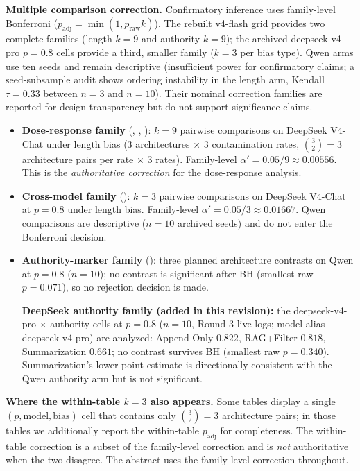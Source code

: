 \documentclass[11pt]{article}
\begin{document}
\textbf{Multiple comparison correction.} Confirmatory inference uses family-level Bonferroni ($p_{\text{adj}} = \min(1,p_{\text{raw}}k)$). The rebuilt v4-flash grid provides two complete families (length $k{=}9$ and authority $k{=}9$); the archived deepseek-v4-pro $p{=}0.8$ cells provide a third, smaller family ($k{=}3$ per bias type). Qwen arms use ten seeds and remain descriptive (insufficient power for confirmatory claims; a seed-subsample audit shows ordering instability in the length arm, Kendall $\tau=0.33$ between $n{=}3$ and $n{=}10$). Their nominal correction families are reported for design transparency but do not support significance claims.

\begin{itemize}[nosep]
    \item \textbf{Dose-response family} (, , ): $k = 9$ pairwise comparisons on DeepSeek V4-Chat under length bias ($3$ architectures $\times$ $3$ contamination rates, $\binom{3}{2}=3$ architecture pairs per rate $\times$ $3$ rates). Family-level $\alpha' = 0.05/9 \approx 0.00556$. This is the \emph{authoritative correction} for the dose-response analysis.
    \item \textbf{Cross-model family} (): $k = 3$ pairwise comparisons on DeepSeek V4-Chat at $p=0.8$ under length bias. Family-level $\alpha' = 0.05/3 \approx 0.01667$. Qwen comparisons are descriptive ($n=10$ archived seeds) and do not enter the Bonferroni decision.
    \item \textbf{Authority-marker family} (): three planned architecture contrasts on Qwen at $p=0.8$ ($n=10$); no contrast is significant after BH (smallest raw $p = 0.071$), so no rejection decision is made.\par\smallskip\noindent \textbf{DeepSeek authority family (added in this revision):} the deepseek-v4-pro $\times$ authority cells at $p=0.8$ ($n=10$, Round-3 live logs; model alias deepseek-v4-pro) are analyzed: Append-Only $0.822$, RAG+Filter $0.818$, Summarization $0.661$; no contrast survives BH (smallest raw $p = 0.340$). Summarization's lower point estimate is directionally consistent with the Qwen authority arm but is not significant.
\end{itemize}

\textbf{Where the within-table $k=3$ also appears.} Some tables display a single $(p, \text{model}, \text{bias})$ cell that contains only $\binom{3}{2}=3$ architecture pairs; in those tables we additionally report the within-table $p_{\text{adj}}$ for completeness. The within-table correction is a subset of the family-level correction and is \emph{not} authoritative when the two disagree. The abstract uses the family-level correction throughout.
\end{document}
